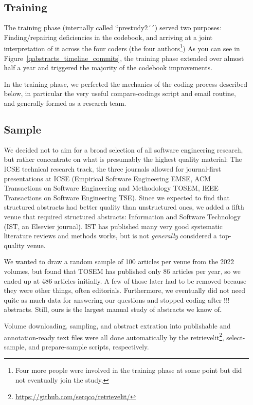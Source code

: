 \documentclass[10pt,journal,compsoc]{IEEEtran}
\newcommand{\Prg}[1]{\bgroup\ttfamily #1\egroup}  %
\begin{document}
\subsection{Training}

The training phase (internally called ``prestudy2´´) served two purposes:
Finding/repairing deficiencies in the codebook,
and arriving at a joint interpretation of it across the four coders 
(the four authors\footnote{Four more people were involved in the training phase at some
  point but did not eventually join the study.})
As you can see in Figure~\ref{qabstracts_timeline_commits},
the training phase extended over almost half a year and triggered
the majority of the codebook improvements.

In the training phase, we perfected the mechanics of the coding process
described below, in particular the very useful \Prg{compare-codings} script
and email routine,
and generally formed as a research team.


\subsection{Sample}

We decided not to aim for a broad selection of all software engineering research,
but rather concentrate on what is presumably the highest quality material:
The ICSE technical research track,
the three journals allowed for journal-first presentations at ICSE
(Empirical Software Engineering EMSE, 
ACM Transactions on Software Engineering and Methodology TOSEM, 
IEEE Transactions on Software Engineering TSE).
Since we expected to find that structured abstracts had better quality
than unstructured ones, we added a fifth venue that required structured abstracts:
Information and Software Technology (IST, an Elsevier journal).
IST has published many very good systematic literature reviews and methods works,
but is not \emph{generally} considered a top-quality venue.

We wanted to draw a random sample of 100 articles per venue from the
2022 volumes, but found that TOSEM has published only 86 articles per year,
so we ended up at 486 articles initially.
A few of those later had to be removed because they were other things,
often editorials.
Furthermore, we eventually did not need quite as much data for answering our
questions and stopped coding after !!! abstracts.
Still, ours is the largest manual study of abstracts we know of.

Volume downloading, sampling, and abstract extration into publishable 
and annotation-ready text files were all done automatically by the
retrievelit\footnote{\url{https://github.com/serqco/retrievelit/}},
select-sample, and prepare-sample scripts, respectively.
\end{document}
